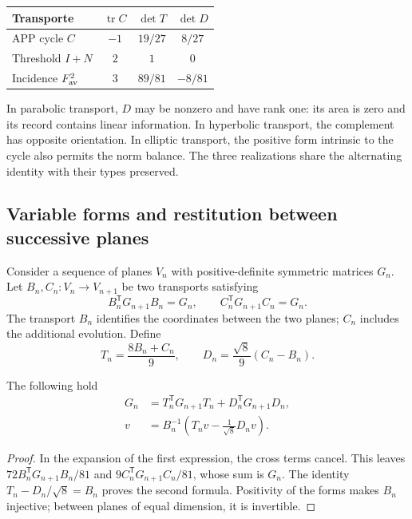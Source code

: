\begin{tablacompleta}
\caption{Contributions to the oriented area of three generated transports.}
\begin{tabular}{lccc}
\toprule
Transporte&\(\operatorname{tr}C\)&\(\det T\)&\(\det D\)\\
\midrule APP cycle \(C\)&$-1$&$19/27$&$8/27$\\
Threshold \(I+N\)&$2$&$1$&$0$\\
Incidence \(F_{\rm av}^2\)&$3$&$89/81$&$-8/81$\\
\bottomrule
\end{tabular}
\end{tablacompleta}

In parabolic transport, \(D\) may be nonzero and have rank one: its area is zero and its record contains linear information. In hyperbolic transport, the complement has opposite orientation. In elliptic transport, the positive form intrinsic to the cycle also permits the norm balance. The three realizations share the alternating identity with their types preserved.

\subsection{Variable forms and restitution between successive planes}
\label{eul:formas-variables}

Consider a sequence of planes \(V_n\) with positive-definite symmetric matrices \(G_n\). Let \(B_n,C_n:V_n\to V_{n+1}\) be two transports satisfying
\[
 B_n^\mathsf TG_{n+1}B_n=G_n,
 \qquad C_n^\mathsf TG_{n+1}C_n=G_n.
\]
The transport \(B_n\) identifies the coordinates between the two planes; \(C_n\) includes the additional evolution. Define
\[
 T_n=\frac{8B_n+C_n}{9},\qquad
 D_n=\frac{\sqrt8}{9}(C_n-B_n).
\]

\begin{teorema}
\label{eul:teo:forma-variable}
The following hold
\begin{align}
 G_n&=T_n^\mathsf TG_{n+1}T_n+D_n^\mathsf TG_{n+1}D_n,
 \label{eul:eq:balance-variable}\\
 v&=B_n^{-1}\left(T_nv-\frac1{\sqrt8}D_nv\right).
 \label{eul:eq:recuperacion-variable}
\end{align}
\end{teorema}
\begin{proof}
In the expansion of the first expression, the cross terms cancel. This leaves \(72B_n^\mathsf TG_{n+1}B_n/81\) and \(9C_n^\mathsf TG_{n+1}C_n/81\), whose sum is \(G_n\). The identity \(T_n-D_n/\sqrt8=B_n\) proves the second formula. Positivity of the forms makes \(B_n\) injective; between planes of equal dimension, it is invertible.
\end{proof}

